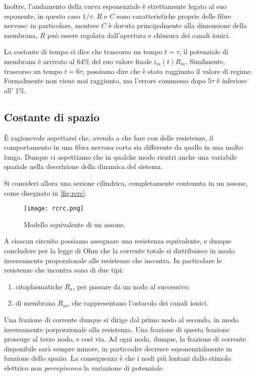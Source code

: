 Inoltre, l'andamento della curva esponenziale è strettamente legato al suo esponente, in questo caso $1/\tau$. $R$ e $C$ sono caratteristiche proprie delle fibre nervose: in particolare, mentree $C$ è dovuta principalmente alla dimensione della membrana, $R$ può essere regolata dall'apertura e chiusura dei canali ionici.


La costante di tempo ci dice che trascorso un tempo $t=\tau$, il potenziale di membrana è arrivato al 64\% del suo valore finale $i_m(t) R_m$. Similmente, trascorso un tempo $t=6\tau$, possiamo dire che è stato raggiunto il valore di regime. Formalmente non viene mai raggiunto, ma l'errore commesso dopo $5\tau$ è inferiore all' 1\%.

\subsection{Costante di spazio}
È ragionevole aspettarsi che, avendo a che fare con delle resistenze, il comportamento in una fibra nervosa corta sia differente da quello in una molto lunga. Dunque ci aspettiamo che in qualche modo rientri anche una variabile spaziale nella descrizione della dinamica del sistema.

Si consideri allora una sezione cilindrica, completamente contenuta in un assone, come disegnato in \autoref{fig:rcrc}.

\begin{figure}[h]
    \centering
    \texttt{[image: rcrc.png]}
    \caption{Modello equivalente di un assone.}
    \label{fig:rcrc}
\end{figure}

A ciascun circuito possiamo assegnare una resistenza equivalente, e dunque concludere per la legge di Ohm che la corrente totale si distribuisce in modo inversamente proporzionale alle resistenze che incontra. In particolare le resistenze che incontra sono di due tipi:
\begin{enumerate}
    \item citoplasmatiche $R_a$, per passare da un nodo al successivo;
    \item di membrana $R_m$, che rappresentano l'ostacolo dei canali ionici.
\end{enumerate}
Una frazione di corrente dunque si dirige dal primo nodo al secondo, in modo inversamente porporzionale alla resistenza. Una frazione di questa frazione proseuge al terzo nodo, e così via. Ad ogni nodo, dunque, la frazione di corrente disponibile sarà sempre minore, in particoalre decresce esponenzialmente in funzione dello spazio. La conseguenza è che i nodi più lontani dallo stimolo elettrico non \textit{percepiscono} la variazione di potenziale.

